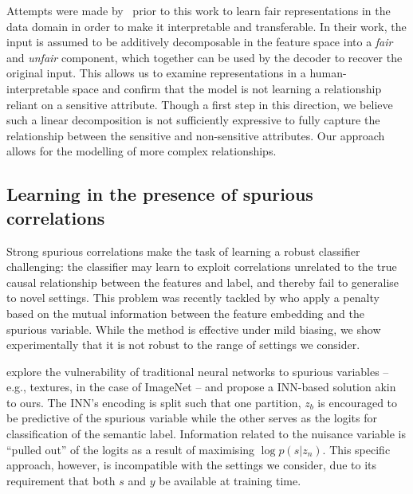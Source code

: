 Attempts were made by~\citet{QuaShaTho19} prior to this work to learn fair representations in the data domain in order to make it interpretable and transferable.
In their work, the input is assumed to be additively decomposable in the feature space into a \emph{fair} and \emph{unfair} component, which together can be used by the decoder to recover the original input.
This allows us to examine representations in a human-interpretable space and confirm that the model is not learning a relationship reliant on a sensitive attribute.
Though a first step in this direction, we believe such a linear decomposition is not sufficiently expressive to fully capture the relationship between the sensitive and non-sensitive attributes.
Our approach allows for the modelling of more complex relationships.

\subsection{Learning in the presence of spurious correlations}
Strong spurious correlations make the task of learning a robust classifier challenging: the classifier may learn to exploit correlations unrelated to the true causal relationship between the features and label, and thereby fail to generalise to novel settings.
This problem was recently tackled by \citet{kim2019learning} who apply a penalty based on the mutual information between the feature embedding and the spurious variable. 
While the method is effective under mild biasing, we show experimentally that it is not robust to the range of settings we consider.

\citet{JacBehZemBet19} explore the vulnerability of traditional neural networks to spurious variables -- e.g., textures, in the case of ImageNet \citep{Geir18} -- and propose a INN-based solution akin to ours.
The INN's encoding is split such that one partition, $z_b$ is encouraged to be predictive of the spurious variable while the other serves as the logits for classification of the semantic label. 
Information related to the nuisance variable is ``pulled out'' of the logits as a result of maximising $\log p(s|z_n)$.
This specific approach, however, is incompatible with the settings we consider, due to its requirement that both $s$ and $y$ be available at training time.


